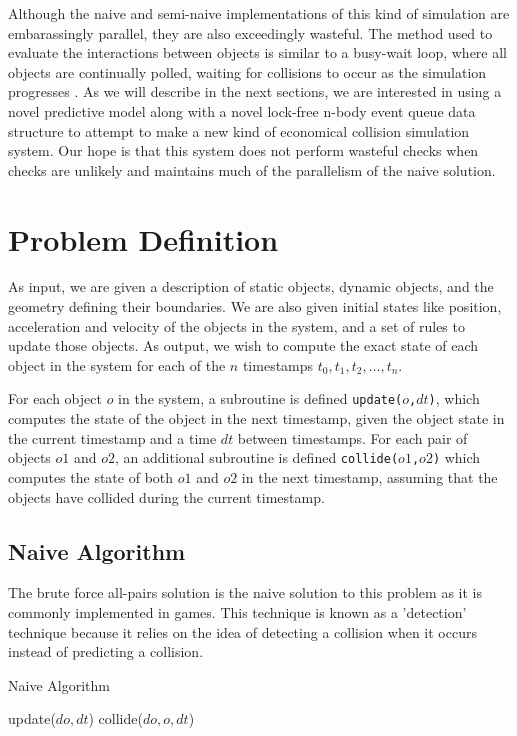 \documentclass[conference]{IEEEtran}
\begin{document}
Although the naive and semi-naive implementations of this kind of simulation are embarassingly parallel, they are also exceedingly wasteful.  The method used to evaluate the interactions between objects is similar to a busy-wait loop, where all objects are continually polled, waiting for collisions to occur as the simulation progresses \cite{nbodycollisions,Moore88collisiondetection}.   As we will describe in the next sections, we are interested in using a novel predictive model along with a novel lock-free n-body event queue data structure to attempt to make a new kind of economical collision simulation system.  Our hope is that this system does not perform wasteful checks when checks are unlikely and maintains much of the parallelism of the naive solution.

\section{Problem Definition}

As input, we are given a description of static objects, dynamic objects, and the geometry defining their boundaries.  We are also given initial states like position, acceleration and velocity of the objects in the system, and a set of rules to update those objects.  As output, we wish to compute the exact state of each object in the system for each of the $n$ timestamps $t_0, t_1, t_2, \ldots, t_n$.

For each object $o$ in the system, a subroutine is defined \texttt{update($o$,$dt$)}, which computes the state of the object in the next timestamp, given the object state in the current timestamp and a time $dt$ between timestamps.  For each pair of objects $o1$ and $o2$, an additional subroutine is defined \texttt{collide($o1$,$o2$)} which computes the state of both $o1$ and $o2$ in the next timestamp, assuming that the objects have collided during the current timestamp.

\subsection{Naive Algorithm}

The brute force all-pairs solution is the naive solution to this problem as it is commonly implemented in games. This technique is known as a 'detection' technique because it relies on the idea of detecting a collision when it occurs instead of predicting a collision.  

\begin{algorithm}
\caption{Naive Algorithm}
\begin{algorithmic}
		\STATE update($do,dt$)  
				\STATE collide($do, o, dt$)
			\ENDIF
		\ENDFOR
	\ENDFOR
\ENDFOR
\end{algorithmic}
\end{algorithm}
\end{document}
